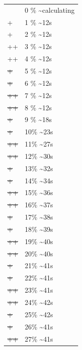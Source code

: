 \documentclass[12pt]{article}
\begin{document}
\begin{center}
\begin{tabular}{ll}
 & 0 \% \textasciitilde{}calculating\\
+ & 1 \% \textasciitilde{}12s\\
+ & 2 \% \textasciitilde{}12s\\
++ & 3 \% \textasciitilde{}12s\\
++ & 4 \% \textasciitilde{}12s\\
\sout{+} & 5 \% \textasciitilde{}12s\\
\sout{+} & 6 \% \textasciitilde{}12s\\
\sout{++} & 7 \% \textasciitilde{}12s\\
\sout{++} & 8 \% \textasciitilde{}12s\\
\sout{\sout{+}} & 9 \% \textasciitilde{}18s\\
\sout{\sout{+}} & 10\% \textasciitilde{}23s\\
\sout{\sout{++}} & 11\% \textasciitilde{}27s\\
\sout{\sout{++}} & 12\% \textasciitilde{}30s\\
\sout{\sout{\sout{+}}} & 13\% \textasciitilde{}32s\\
\sout{\sout{\sout{+}}} & 14\% \textasciitilde{}34s\\
\sout{\sout{\sout{++}}} & 15\% \textasciitilde{}36s\\
\sout{\sout{\sout{++}}} & 16\% \textasciitilde{}37s\\
\sout{\sout{\sout{\sout{+}}}} & 17\% \textasciitilde{}38s\\
\sout{\sout{\sout{\sout{+}}}} & 18\% \textasciitilde{}39s\\
\sout{\sout{\sout{\sout{++}}}} & 19\% \textasciitilde{}40s\\
\sout{\sout{\sout{\sout{++}}}} & 20\% \textasciitilde{}40s\\
\sout{\sout{\sout{\sout{\sout{+}}}}} & 21\% \textasciitilde{}41s\\
\sout{\sout{\sout{\sout{\sout{+}}}}} & 22\% \textasciitilde{}41s\\
\sout{\sout{\sout{\sout{\sout{++}}}}} & 23\% \textasciitilde{}41s\\
\sout{\sout{\sout{\sout{\sout{++}}}}} & 24\% \textasciitilde{}42s\\
\sout{\sout{\sout{\sout{\sout{\sout{+}}}}}} & 25\% \textasciitilde{}42s\\
\sout{\sout{\sout{\sout{\sout{\sout{+}}}}}} & 26\% \textasciitilde{}41s\\
\sout{\sout{\sout{\sout{\sout{\sout{++}}}}}} & 27\% \textasciitilde{}41s\\

\end{tabular}
\end{center}
\end{document}
